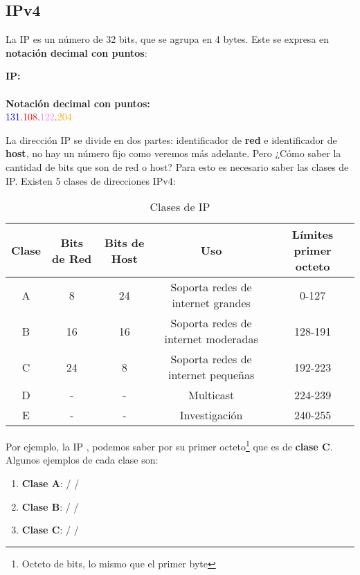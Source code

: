 \documentclass[
	12pt, %
	fleqn, %
	a4paper, %
	oneside, %
]{LegrandOrangeBook}
\begin{document}
\subsection{IPv4}
La IP es un número de 32 bits, que se agrupa en 4 bytes. Este se expresa en \textbf{notación decimal con puntos}:
\begin{center}
\textbf{IP:}\\
\ipAddress{\textcolor{blue}{10000011}\textcolor{red}{01101100}\textcolor{violet}{01111010}\textcolor{orange}{11001100}}\\
\textbf{Notación decimal con puntos:}\\
\textcolor{blue}{131}.\textcolor{red}{108}.\textcolor{violet}{122}.\textcolor{orange}{204}
\end{center}
La dirección IP se divide en dos partes: identificador de \textbf{red} e identificador de \textbf{host}, no hay un número fijo como veremos más adelante. Pero ¿Cómo saber la cantidad de bits que son de red o host? Para esto es necesario saber las clases de IP. Existen 5 clases de direcciones IPv4:
\begin{table}[H]
\begin{center}
\begin{tabular}{|c|c|c|c|c|}
\hline
\rowcolor[HTML]{DAE8FC} 
Clase & Bits de Red & Bits de Host & Uso                                 & Límites primer octeto \\ \hline
A     & 8           & 24           & Soporta redes de internet grandes   & 0-127                 \\ \hline
B     & 16          & 16           & Soporta redes de internet moderadas & 128-191               \\ \hline
C     & 24          & 8            & Soporta redes de internet pequeñas  & 192-223               \\ \hline
D     & -           & -            & Multicast                           & 224-239               \\ \hline
E     & -           & -            & Investigación                       & 240-255               \\ \hline
\end{tabular}
\end{center}
\caption{Clases de IP}
\end{table}
Por ejemplo, la IP , podemos saber por su primer octeto\footnote{Octeto de bits, lo mismo que el primer byte} que es de \textbf{clase C}. Algunos ejemplos de cada clase son:
\begin{enumerate}
\item \textbf{Clase A}: / / 
\item \textbf{Clase B}: / / 
\item \textbf{Clase C}: / / 
\end{enumerate}
\end{document}
